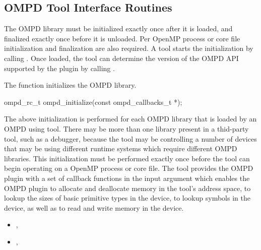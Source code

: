 
\subsection{OMPD Tool Interface Routines}
\label{sec:ompd-api}


The OMPD library must be initialized exactly once after it is loaded, and finalized exactly once
before it is unloaded. Per OpenMP process or core file initialization and finalization are also required. 
A tool starts the initialization by calling . Once loaded, the 
tool can determine the version of the OMPD API supported by the plugin by 
calling .

\label{ompd:ompd_initialize}

\summary
The  function initializes the OMPD library.

\format

\cspecificstart
\begin{ompSyntax}
ompd_rc_t ompd_initialize(const ompd_callbacks_t *);
\end{ompSyntax}
\cspecificend

\descr
The above initialization is performed for each OMPD library that is loaded by an OMPD using tool. 
There may be more than one library present in a thid-party tool, such as a debugger, because the tool 
may be controlling a number of devices that may be using different runtime systems which require 
different OMPD libraries. This initialization must be performed exactly once before the tool
can begin operating on a OpenMP process or core file.
\argdesc
The tool provides the OMPD plugin with a set of callback functions in the  input argument
which enables the OMPD plugin to allocate and deallocate memory in the tool's address space, to lookup the 
sizes of basic primitive types in the device, to lookup symbols in the device, as well as to read and 
write memory in the device.

\crossreferences
\begin{itemize}
	\item
	, 
	\item
	, 
\end{itemize}

\label{ompd:ompd_get_version}

